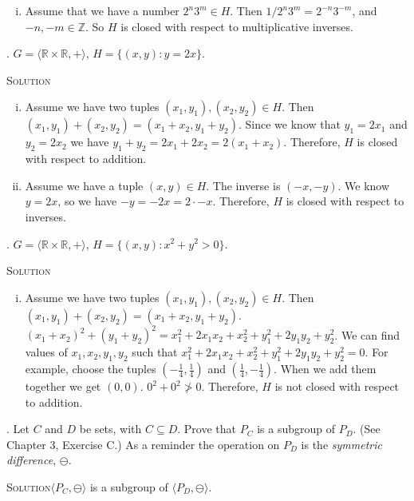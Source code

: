 \documentclass[twoside]{amsart}
\newcommand{\solution}{\textsc{Solution}\xspace}
\begin{document}
\begin{enumerate}[A.]
\begin{enumerate}[(i)]
      \item Assume that we have a number $2^n3^m \in H$. Then
      $1/2^n3^m = 2^{-n}3^{-m}$, and $-n, -m \in \mathbb{Z}$. So
      $H$ is closed with respect to multiplicative inverses.
   \end{enumerate}

   . $G = \langle \mathbb{R} \times \mathbb{R},+ \rangle,\, H =
   \{ (x,y) : y = 2x\}$.

   \noindent \solution 
   
   \begin{enumerate}[(i)]
      \item Assume we have two tuples $(x_1,y_1),(x_2,y_2) \in H$. Then
      $(x_1,y_1)+(x_2,y_2) = (x_1+x_2,y_1+y_2)$. Since we know that $y_1 =
      2x_1$ and $y_2 = 2x_2$ we have $y_1+y_2 = 2x_1 + 2x_2 = 2(x_1+x_2)$.
      Therefore, $H$ is closed with respect to addition.

      \item Assume we have a tuple $(x,y)\in H$. The inverse is
      $(-x,-y)$. We know $y=2x$, so we have $-y = -2x = 2 \cdot -x$.
      Therefore, $H$ is closed with respect to inverses.

   \end{enumerate}

   . $ G =\langle \mathbb{R} \times \mathbb{R}, + \rangle,\, H=
   \{(x,y) : x^2 + y^2 > 0\}$.

   \noindent \solution 
   \begin{enumerate}[(i)]
      \item Assume we have two tuples $(x_1,y_1),(x_2,y_2)\in H$. Then
      $(x_1,y_1) + (x_2,y_2) = (x_1+x_2,y_1+y_2)$. $(x_1+x_2)^2 +
      (y_1+y_2)^2 = x_1^2 + 2x_1x_2 + x_2^2 + y_1^2 + 2y_1y_2 + y_2^2$.
      We can find values of $x_1,x_2,y_1,y_2$ such that 
      $ x_1^2 + 2x_1x_2 + x_2^2 + y_1^2 + 2y_1y_2 + y_2^2 = 0$. For example,
      choose the tuples $(-\frac{1}{4},\frac{1}{4})$ and $(\frac{1}{4},
      - \frac{1}{4})$. When we add them together we get $(0,0)$. 
      $0^2 + 0^2 \not > 0$.
      Therefore, $H$ is not closed with respect to addition.
   \end{enumerate}

   . Let $C$ and $D$ be sets, with $C \subseteq D$. Prove
   that $P_C$ is a subgroup of $P_D$. (See Chapter 3, Exercise C.)
   As a reminder the operation on $P_D$ is the \emph{symmetric difference},
   $\ominus$.

   \noindent \solution  $\langle P_C,\ominus \rangle$ is a subgroup of
   $\langle P_D,\ominus \rangle$.
   

\end{enumerate}
\end{document}
